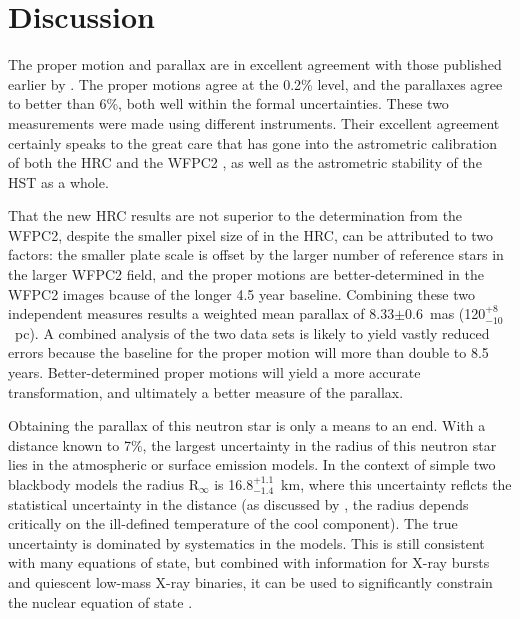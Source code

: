 \documentclass[12pt,preprint]{aastex}
\newcommand{\ud}[2]{\mbox{$^{+ #1}_{- #2}$}}
\begin{document}
\section{Discussion}

The proper motion and parallax are in excellent agreement with those published
earlier by \citet{WL02}. The proper motions agree at the 0.2\% level, and the
parallaxes agree to better than 6\%, both well within the formal uncertainties.
These two measurements were made using different instruments.
Their excellent agreement 
certainly speaks to the great care that has gone into the
astrometric calibration of both the HRC \citep{AK04} and the WFPC2
\citep{H95}, as well as the astrometric stability of the HST as a whole. 

That the new HRC results are not superior to the determination from the WFPC2,
despite the 
smaller pixel size of in the HRC, can be attributed to two factors:
the smaller plate scale
is offset by the larger number of reference stars in the larger WFPC2 field,
and the proper motions are better-determined in the WFPC2 images bcause of the
longer 4.5 year baseline.
Combining these two independent
measures results a weighted mean parallax of 8.33$\pm$0.6~mas
(120\ud{8}{10}~pc). A combined analysis of the two data sets is likely to
yield vastly reduced errors because the baseline for the proper motion will more
than double to 8.5 years. Better-determined proper motions will yield a
more accurate transformation, and ultimately a better measure of the parallax.

Obtaining the parallax of this neutron star is only a means to an end.
With a distance
known to 7\%, the largest uncertainty in the radius of this
neutron star lies in the atmospheric or surface emission models.
In the context of simple two blackbody
models the radius R$_\infty$ is 16.8\ud{1.1}{1.4}~km, where this uncertainty 
reflcts the statistical uncertainty in the distance
(as discussed by \cite{P01}, the
radius depends critically on the ill-defined temperature of the cool component).
The true uncertainty is dominated by systematics in the models. 
This is still consistent with many equations of state, but combined with
information for X-ray bursts and quiescent low-mass X-ray binaries, it can be
used to significantly constrain the nuclear equation of state 
\citep{SLB10}.


\end{document}
